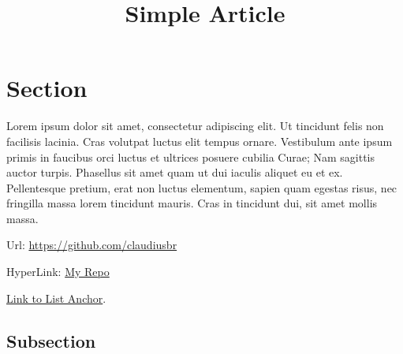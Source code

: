 \documentclass[a4paper,12pt]{article}
\title{Simple Article}
\begin{document}
\maketitle

\tableofcontents
\newpage
	
	
\section{Section} \label{sec:Step2}
  Lorem ipsum dolor sit amet, consectetur adipiscing elit. Ut tincidunt felis
  non facilisis lacinia. Cras volutpat luctus elit tempus ornare. Vestibulum
  ante ipsum primis in faucibus orci luctus et ultrices posuere cubilia Curae;
  Nam sagittis auctor turpis. Phasellus sit amet quam ut dui iaculis aliquet eu
  et ex. Pellentesque pretium, erat non luctus elementum, sapien quam egestas
  risus, nec fringilla massa lorem tincidunt mauris. Cras in tincidunt dui, sit
  amet mollis massa.

  Url: \url{https://github.com/claudiusbr}

  HyperLink: \href{https://github.com/claudiusbr}{My Repo}

  \hyperref[sec:Step2]{Link to List Anchor}.

	
\subsection{Subsection}

  
\end{document}
